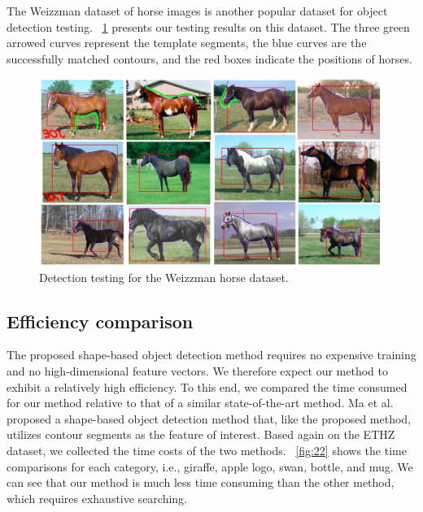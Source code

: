 \documentclass[journal]{IEEEtran}
\begin{document}
The Weizzman dataset of horse images is another popular dataset for object detection testing. 
\figurename~\ref{fig:21} presents our testing results on this dataset. 
The three green arrowed curves represent the template segments, 
the blue curves are the successfully matched contours, and the red boxes indicate the positions of horses.

\begin{figure}[!t]
\centering
\includegraphics[width=0.95\linewidth]{images/fig21.jpg}
\caption{Detection testing for the Weizzman horse dataset.}
\label{fig:21}
\end{figure}

\subsection{Efficiency comparison}

The proposed shape-based object detection method requires no expensive training and no high-dimensional feature vectors. We therefore expect our method to exhibit a relatively high efficiency. 
To this end, we compared the time consumed for our method relative to that of a similar state-of-the-art method. 
Ma et al. \cite{ma2011} proposed a shape-based object detection method that, 
like the proposed method, utilizes contour segments as the feature of interest. 
Based again on the ETHZ dataset, we collected the time costs of the two methods.
\figurename~\ref{fig:22} shows the time comparisons for each category, 
i.e., giraffe, apple logo, swan, bottle, and mug. 
We can see that our method is much less time consuming than the other method, 
which requires exhaustive searching.
\end{document}
